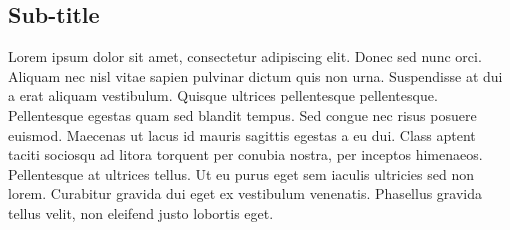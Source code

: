 \subsection{Sub-title}
Lorem ipsum dolor sit amet, consectetur adipiscing elit. Donec sed nunc orci. Aliquam
nec nisl vitae sapien pulvinar dictum quis non urna. Suspendisse at dui a erat
aliquam vestibulum. Quisque ultrices pellentesque pellentesque. Pellentesque
egestas quam sed blandit tempus. Sed congue nec risus posuere euismod. Maecenas
ut lacus id mauris sagittis egestas a eu dui. Class aptent taciti sociosqu ad litora
torquent per conubia nostra, per inceptos himenaeos. Pellentesque at ultrices tellus.
Ut eu purus eget sem iaculis ultricies sed non lorem. Curabitur gravida dui eget
ex vestibulum venenatis. Phasellus gravida tellus velit, non eleifend justo lobortis
eget.